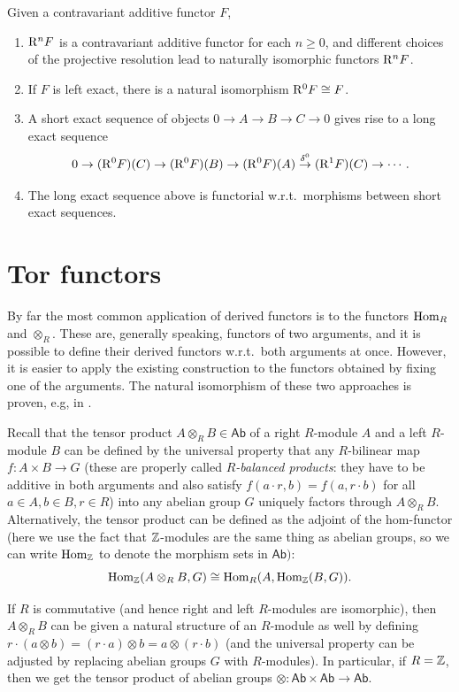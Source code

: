 \begin{thm}
    Given a contravariant additive functor $F$, 
    \begin{enumerate}
        \item $\mathrm{R}^nF$ is a contravariant additive functor for each $n\geq 0$, and different choices of the projective resolution lead to naturally isomorphic functors $\mathrm{R}^nF$.
        \item If $F$ is left exact, there is a natural isomorphism $\mathrm{R}^0F\cong F$.
        \item A short exact sequence of objects $0\to A\to B\to C\to 0$ gives rise to a long exact sequence
        \[0\to (\mathrm{R}^0F)(C)\to (\mathrm{R}^0F)(B)\to (\mathrm{R}^0F)(A)\overset{\delta^0}{\to} (\mathrm{R}^1F)(C)\to \cdots.\]
        \item The long exact sequence above is functorial w.r.t.\ morphisms between short exact sequences.
    \end{enumerate}
\end{thm}




\section{Tor functors}

By far the most common application of derived functors is to the functors $\operatorname{Hom}_R$ and $\otimes_R$. These are, generally speaking, functors of two arguments, and it is possible to define their derived functors w.r.t.\ both arguments at once. However, it is easier to apply the existing construction to the functors obtained by fixing one of the arguments. The natural isomorphism of these two approaches is proven, e.g, in \cite{Rotman}.

Recall that the tensor product $A\otimes_R B \in \mathsf{Ab}$ of a right $R$-module $A$ and a left $R$-module $B$ can be defined by the universal property that any $R$-bilinear map $f:A\times B\to G$ (these are properly called \emph{$R$-balanced products}: they have to be additive in both arguments and also satisfy $f(a\cdot r,b)=f(a,r\cdot b)$ for all $a\in A,b\in B,r\in R$) into any abelian group $G$ uniquely factors through $A\otimes_R B$. Alternatively, the tensor product can be defined as the adjoint of the hom-functor (here we use the fact that $\mathbb{Z}$-modules are the same thing as abelian groups, so we can write $\operatorname{Hom}_{\mathbb{Z}}$ to denote the morphism sets in $\mathsf{Ab})$:
\[\operatorname{Hom}_{\mathbb{Z}}(A\otimes_R B,G)\cong \operatorname{Hom}_R(A,\operatorname{Hom}_{\mathbb{Z}}(B,G)).\]

If $R$ is commutative (and hence right and left $R$-modules are isomorphic), then $A\otimes_R B$ can be given a natural structure of an $R$-module as well by defining $r\cdot(a\otimes b)=(r\cdot a)\otimes b=a\otimes (r\cdot b)$ (and the universal property can be adjusted by replacing abelian groups $G$ with $R$-modules).  In particular, if $R=\mathbb{Z}$, then we get the tensor product of abelian groups $\otimes:\mathsf{Ab}\times \mathsf{Ab}\to \mathsf{Ab}$.


